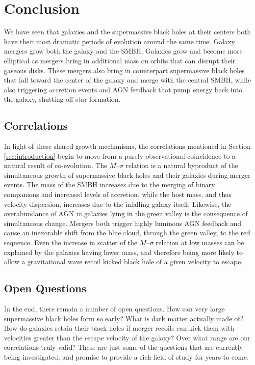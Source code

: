 
\section{Conclusion}
\label{sec:conclusion}

We have seen that galaxies and the supermassive black holes at their centers both have their most dramatic periods of evolution around the same time.  Galaxy mergers grow both the galaxy and the SMBH.  Galaxies grow and become more elliptical as mergers bring in additional mass on orbits that can disrupt their gaseous disks.  These mergers also bring in counterpart supermassive black holes that fall toward the center of the galaxy and merge with the central SMBH, while also triggering accretion events and AGN feedback that pump energy back into the galaxy, shutting off star formation.



\subsection{Correlations}

In light of these shared growth mechanisms, the correlations mentioned in Section \ref{sec:introduction} begin to move from a purely observational coincidence to a natural result of co-evolution.  The $M$--$\sigma$ relation is a natural byproduct of the simultaneous growth of supermassive black holes and their galaxies during merger events.  The mass of the SMBH increases due to the merging of binary companions and increased levels of accretion, while the host mass, and thus velocity dispersion, increases due to the infalling galaxy itself.  Likewise, the overabundance of AGN in galaxies lying in the green valley is the consequence of simultaneous change.  Mergers both trigger highly luminous AGN feedback and cause an inexorable shift from the blue cloud, through the green valley, to the red sequence.  Even the increase in scatter of the $M$--$\sigma$ relation at low masses can be explained by the galaxies having lower mass, and therefore being more likely to allow a gravitational wave recoil kicked black hole of a given velocity to escape.



\subsection{Open Questions}

In the end, there remain a number of open questions.  How can very large supermassive black holes form so early?  What is dark matter actually made of?  How do galaxies retain their black holes if merger recoils can kick them with velocities greater than the escape velocity of the galaxy?  Over what range are our correlations truly valid?  These are just some of the questions that are currently being investigated, and promise to provide a rich field of study for years to come.



